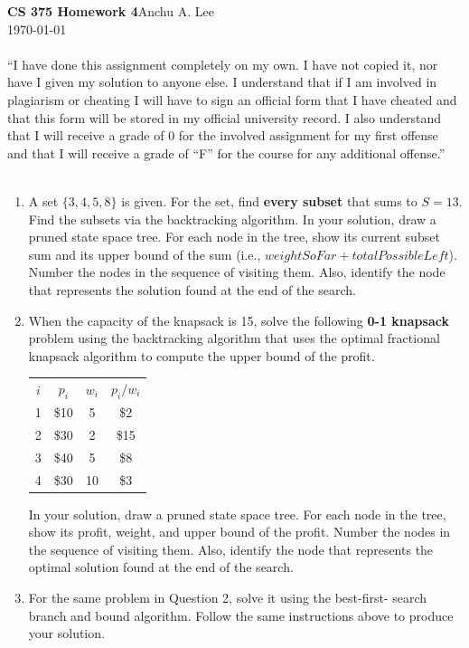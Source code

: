 \documentclass{article}
\begin{document}
\noindent\textbf{CS 375 Homework 4}\hfill Anchu A. Lee\\
\noindent\today
\\\\“I have done this assignment completely on my own. I have not copied it, nor have I given my solution to anyone else. I understand that if I am involved in plagiarism or cheating I will have to sign an official form that I have cheated and that this form will be stored in my official university record. I also understand that I will receive a grade of 0 for the involved assignment for my first offense and that I will receive a grade of “F” for the course for any additional offense.” 
\\\\
\begin{enumerate}
    \item A set $\{3, 4, 5, 8\}$ is given. For the set, find \textbf{every 
    subset} that sums to $S = 13$. Find the subsets via the backtracking 
    algorithm. In your solution, draw a pruned state space tree. For each node 
    in the tree, show its current subset sum and its upper bound of the sum 
    (i.e., $weightSoFar + totalPossibleLeft$). Number the nodes in the 
    sequence of visiting them. Also, identify the node that represents the 
    solution found at the end of the search.
    
    \item When the capacity of the knapsack is 15, solve the following 
    \textbf{0-1 knapsack} problem using the backtracking algorithm that uses 
    the optimal fractional knapsack algorithm to compute the upper bound of 
    the profit.\newline
    \begin{tabular}{c c c c}
        $i$ & $p_i$ & $w_i$ & $p_i / w_i$\\
        1 & \$10 & 5 & \$2\\
        2 & \$30 & 2 & \$15\\
        3 & \$40 & 5 & \$8\\
        4 & \$30 & 10 & \$3
    \end{tabular}\newline
    In your solution, draw a pruned state space tree. For each node in the 
    tree, show its profit, weight, and upper bound of the profit. Number the 
    nodes in the sequence of visiting them. Also, identify the node that 
    represents the optimal solution found at the end of the search.

    \item For the same problem in Question 2, solve it using the best-first-
    search branch and bound algorithm. Follow the same instructions above to 
    produce your solution.
    

\end{enumerate}
\end{document}
